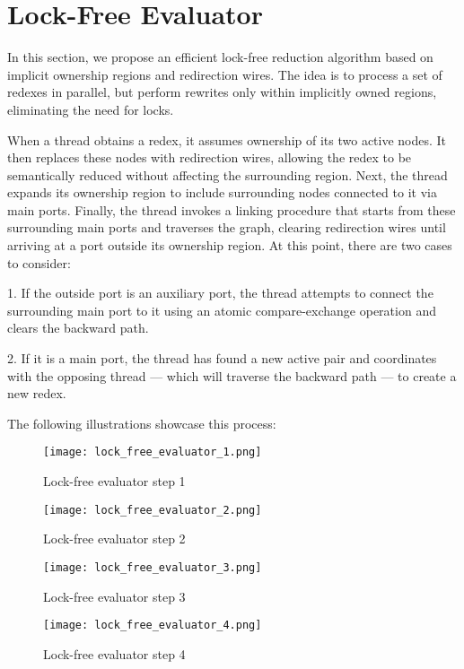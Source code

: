 \documentclass{article}
\begin{document}
\section{Lock-Free Evaluator}\label{s:lockfree}

In this section, we propose an efficient lock-free reduction algorithm based on implicit ownership regions and redirection wires. The idea is to process a set of redexes in parallel, but perform rewrites only within implicitly owned regions, eliminating the need for locks.

When a thread obtains a redex, it assumes ownership of its two active nodes. It then replaces these nodes with redirection wires, allowing the redex to be semantically reduced without affecting the surrounding region. Next, the thread expands its ownership region to include surrounding nodes connected to it via main ports. Finally, the thread invokes a linking procedure that starts from these surrounding main ports and traverses the graph, clearing redirection wires until arriving at a port outside its ownership region. At this point, there are two cases to consider:

1. If the outside port is an auxiliary port, the thread attempts to connect the surrounding main port to it using an atomic compare-exchange operation and clears the backward path.

2. If it is a main port, the thread has found a new active pair and coordinates with the opposing thread — which will traverse the backward path — to create a new redex.

The following illustrations showcase this process:

\begin{figure}[h!]
\centering
\texttt{[image: lock\_free\_evaluator\_1.png]}
\caption{Lock-free evaluator step 1}
\end{figure}

\begin{figure}[h!]
\centering
\texttt{[image: lock\_free\_evaluator\_2.png]}
\caption{Lock-free evaluator step 2}
\end{figure}

\begin{figure}[h!]
\centering
\texttt{[image: lock\_free\_evaluator\_3.png]}
\caption{Lock-free evaluator step 3}
\end{figure}

\begin{figure}[h!]
\centering
\texttt{[image: lock\_free\_evaluator\_4.png]}
\caption{Lock-free evaluator step 4}
\end{figure}
\end{document}
